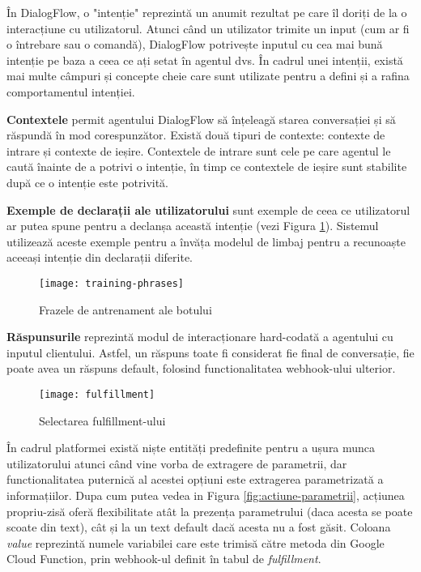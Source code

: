 În DialogFlow, o "intenție" reprezintă un anumit rezultat pe care îl doriți de la o interacțiune cu utilizatorul. Atunci când un utilizator trimite un input (cum ar fi o întrebare sau o comandă), DialogFlow potrivește inputul cu cea mai bună intenție pe baza a ceea ce ați setat în agentul dvs. În cadrul unei intenții, există mai multe câmpuri și concepte cheie care sunt utilizate pentru a defini și a rafina comportamentul intenției.

\textbf{Contextele} permit agentului DialogFlow să înțeleagă starea conversației și să răspundă în mod corespunzător. Există două tipuri de contexte: contexte de intrare și contexte de ieșire. Contextele de intrare sunt cele pe care agentul le caută înainte de a potrivi o intenție, în timp ce contextele de ieșire sunt stabilite după ce o intenție este potrivită.

\textbf{Exemple de declarații ale utilizatorului} sunt exemple de ceea ce utilizatorul ar putea spune pentru a declanșa această intenție (vezi Figura \ref{fig:training-phrases}). Sistemul utilizează aceste exemple pentru a învăța modelul de limbaj pentru a recunoaște aceeași intenție din declarații diferite.

\begin{figure}[H]
    \centering
    \texttt{[image: training-phrases]}
    \caption{Frazele de antrenament ale botului}
    \label{fig:training-phrases}
\end{figure}

\textbf{Răspunsurile} reprezintă modul de interacționare hard-codată a agentului cu inputul clientului. Astfel, un răspuns toate fi considerat fie final de conversație, fie poate avea un răspuns default, folosind functionalitatea webhook-ului ulterior.

\begin{figure}[H]
    \centering
    \texttt{[image: fulfillment]}
    \caption{Selectarea fulfillment-ului}
    \label{fig:fulfillment}
\end{figure}

În cadrul platformei există niște entități predefinite \cite{system-entities} pentru a ușura munca utilizatorului atunci când vine vorba de extragere de parametrii, dar functionalitatea puternică al acestei opțiuni este extragerea parametrizată a informațiilor. Dupa cum putea vedea in Figura \ref{fig:actiune-parametrii}, acțiunea propriu-zisă oferă flexibilitate atât la prezența parametrului (daca acesta se poate scoate din text), cât și la un text default dacă acesta nu a fost găsit. Coloana \emph{value} reprezintă numele variabilei care este trimisă către metoda din Google Cloud Function, prin webhook-ul definit în tabul de \emph{fulfillment}.

